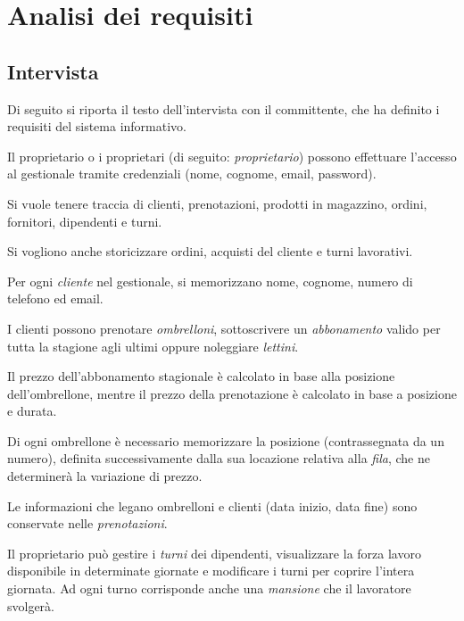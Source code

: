 \chapter{Analisi dei requisiti}

\raggedbottom

\section{Intervista}

Di seguito si riporta il testo dell'intervista con il committente, che ha definito
i requisiti del sistema informativo.

\begin{tcolorbox}[breakable, colback=lightgray, colframe=primary!40, left=8pt, right=8pt,
                  top=6pt, bottom=6pt]
\setlength{\parskip}{6pt}

Il proprietario o i proprietari (di seguito: \textit{proprietario}) possono
effettuare l'accesso al gestionale tramite credenziali (nome, cognome, email, password).

Si vuole tenere traccia di clienti, prenotazioni, prodotti in magazzino,
ordini, fornitori, dipendenti e turni.

Si vogliono anche storicizzare ordini, acquisti del cliente e turni lavorativi. 

Per ogni \textit{cliente} nel gestionale, si memorizzano nome, cognome,
numero di telefono ed email.

I clienti possono prenotare \textit{ombrelloni}, sottoscrivere un \textit{abbonamento} 
valido per tutta la stagione agli ultimi oppure noleggiare \textit{lettini}.

Il prezzo dell'abbonamento stagionale è calcolato in base alla posizione
dell'ombrellone, mentre il prezzo della prenotazione è calcolato in base a posizione e durata.

Di ogni ombrellone è necessario memorizzare la posizione (contrassegnata da un numero), 
definita successivamente dalla sua locazione relativa alla \textit{fila}, che ne determinerà la 
variazione di prezzo.

Le informazioni che legano ombrelloni e clienti (data inizio, data fine)
sono conservate nelle \textit{prenotazioni}.

Il proprietario può gestire i \textit{turni} dei dipendenti, visualizzare
la forza lavoro disponibile in determinate giornate e modificare i turni 
per coprire l'intera giornata. Ad ogni turno corrisponde anche una \textit{mansione} che il 
lavoratore svolgerà.


\end{tcolorbox}
